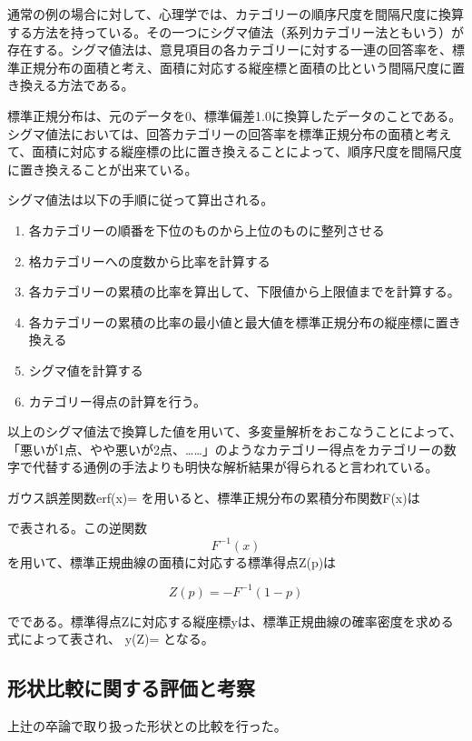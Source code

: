 \documentclass[shuuron]{kuee}
\begin{document}
通常の例の場合に対して、心理学では、カテゴリーの順序尺度を間隔尺度に換算する方法を持っている。その一つにシグマ値法（系列カテゴリー法ともいう）が存在する。シグマ値法は、意見項目の各カテゴリーに対する一連の回答率を、標準正規分布の面積と考え、面積に対応する縦座標と面積の比という間隔尺度に置き換える方法である。

標準正規分布は、元のデータを0、標準偏差1.0に換算したデータのことである。シグマ値法においては、回答カテゴリーの回答率を標準正規分布の面積と考えて、面積に対応する縦座標の比に置き換えることによって、順序尺度を間隔尺度に置き換えることが出来ている。

シグマ値法は以下の手順に従って算出される。
\begin{enumerate}
 \item 各カテゴリーの順番を下位のものから上位のものに整列させる
 \item 格カテゴリーへの度数から比率を計算する
 \item 各カテゴリーの累積の比率を算出して、下限値から上限値までを計算する。
 \item 各カテゴリーの累積の比率の最小値と最大値を標準正規分布の縦座標に置き換える
 \item シグマ値を計算する
 \item カテゴリー得点の計算を行う。
\end{enumerate}

以上のシグマ値法で換算した値を用いて、多変量解析をおこなうことによって、「悪いが1点、やや悪いが2点、……」のようなカテゴリー得点をカテゴリーの数字で代替する通例の手法よりも明快な解析結果が得られると言われている。

ガウス誤差関数erf(x)=
を用いると、標準正規分布の累積分布関数F(x)は

で表される。この逆関数\begin{equation}F^{-1}(x)\end{equation}を用いて、標準正規曲線の面積に対応する標準得点Z(p)は


\begin{equation}
  Z(p) = -F^{-1}(1-p)
\end{equation}

でである。標準得点Zに対応する縦座標yは、標準正規曲線の確率密度を求める式によって表され、
y(Z)=
となる。






\subsection{形状比較に関する評価と考察}
上辻の卒論で取り扱った形状との比較を行った。
\end{document}

